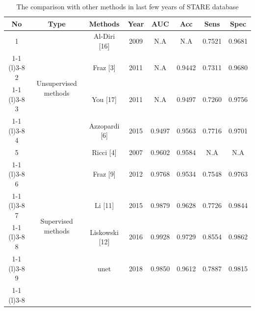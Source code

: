 \documentclass{article}
\begin{document}
\begin{appendices}
\begin{table}[h]
\centering
\caption{The comparison with other methods in last few years of STARE database}
\label{my-label}
\begin{tabular}{@{}cccccccc@{}}
\toprule
No         & Type                                  & Methods                  & Year          & AUC             & Acc             & Sens            & Spec            \\ \midrule
1                        & \multirow{4}{*}{Unsupervised methods} & Al-Diri {[}16{]}         & 2009          & N.A             & N.A             & 0.7521          & 0.9681          \\ \cmidrule(r){1-1} \cmidrule(l){3-8} 
2                        &                                       & Fraz {[}3{]}             & 2011          & N.A             & 0.9442          & 0.7311          & 0.9680          \\ \cmidrule(r){1-1} \cmidrule(l){3-8} 
3                        &                                       & You {[}17{]}             & 2011          & N.A             & 0.9497          & 0.7260          & 0.9756          \\ \cmidrule(r){1-1} \cmidrule(l){3-8} 
4                        &                                       & Azzopardi {[}6{]}       & 2015          & 0.9497          & 0.9563          & 0.7716          & 0.9701          \\ \midrule
5                        & \multirow{8}{*}{Supervised methods}   & Ricci {[}4{]}            & 2007          & 0.9602          & 0.9584          & N.A             & N.A             \\ \cmidrule(r){1-1} \cmidrule(l){3-8} 
6                       &                                       & Fraz {[}9{]}            & 2012          & 0.9768          & 0.9534          & 0.7548          & 0.9763          \\ \cmidrule(r){1-1} \cmidrule(l){3-8} 
7                       &                                       & Li {[}11{]}              & 2015          & 0.9879          & 0.9628          & 0.7726          & 0.9844          \\ \cmidrule(r){1-1} \cmidrule(l){3-8} 
8                       &                                       & Liskowski {[}12{]}       & 2016          & 0.9928          & 0.9729          & 0.8554          & 0.9862          \\ \cmidrule(r){1-1} \cmidrule(l){3-8} 
9                       &                                       & unet       & 2018          & 0.9850          & 0.9612          & 0.7887          & 0.9815          \\ \cmidrule(r){1-1} \cmidrule(l){3-8} 

\end{tabular}
\end{table}
\end{appendices}
\end{document}
